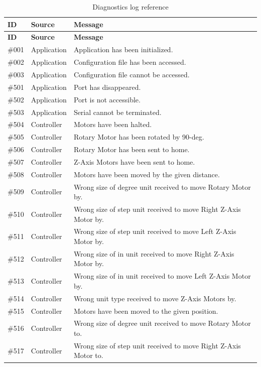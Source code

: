 \documentclass[12pt]{report}
\begin{document}
{\small
\begin{longtable}{|l|l|p{9cm}|}
\caption{Diagnostics log reference} \label{tab:diagnostics} \\
\hline
\textbf{ID} & \textbf{Source} & \textbf{Message} \\
\hline
\endfirsthead
\hline
\textbf{ID} & \textbf{Source} & \textbf{Message} \\
\hline
\endhead
\#001 & Application & Application has been initialized. \\
\#002 & Application & Configuration file has been accessed. \\
\#003 & Application & Configuration file cannot be accessed. \\
\#501 & Application & Port has disappeared. \\
\#502 & Application & Port is not accessible. \\
\#503 & Application & Serial cannot be terminated. \\
\#504 & Controller & Motors have been halted. \\
\#505 & Controller & Rotary Motor has been rotated by 90-deg. \\
\#506 & Controller & Rotary Motor has been sent to home. \\
\#507 & Controller & Z-Axis Motors have been sent to home. \\
\#508 & Controller & Motors have been moved by the given distance. \\
\#509 & Controller & Wrong size of degree unit received to move Rotary Motor by. \\
\#510 & Controller & Wrong size of step unit received to move Right Z-Axis Motor by. \\
\#511 & Controller & Wrong size of step unit received to move Left Z-Axis Motor by. \\
\#512 & Controller & Wrong size of in unit received to move Right Z-Axis Motor by. \\
\#513 & Controller & Wrong size of in unit received to move Left Z-Axis Motor by. \\
\#514 & Controller & Wrong unit type received to move Z-Axis Motors by. \\
\#515 & Controller & Motors have been moved to the given position. \\
\#516 & Controller & Wrong size of degree unit received to move Rotary Motor to. \\
\#517 & Controller & Wrong size of step unit received to move Right Z-Axis Motor to. \\

\end{longtable}}
\end{document}
